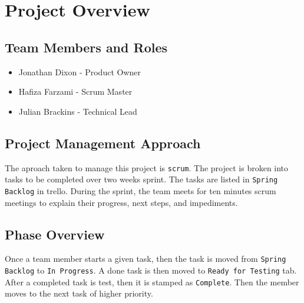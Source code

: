 

\chapter{Project Overview}



\section{Team Members and Roles}

\begin{itemize}
  \item Jonathan Dixon - Product Owner
  \item Hafiza Farzami - Scrum Master
  \item Julian Brackins - Technical Lead  
\end{itemize}





\section{Project  Management Approach}
The aproach taken to manage this project is {\tt scrum}. The project is broken into tasks to be completed over two weeks sprint. The tasks are listed in {\tt Spring Backlog} in trello. During the sprint, the team meets for ten minutes scrum meetings to explain their progress, next steps, and impediments. 


\section{Phase  Overview}
Once a team member starts a given task, then the task is moved from {\tt Spring Backlog} to {\tt In Progress}. A done task is then moved to {\tt Ready for Testing} tab. After a completed task is test, then it is stamped as {\tt Complete}. Then the member moves to the next task of higher priority.

 
